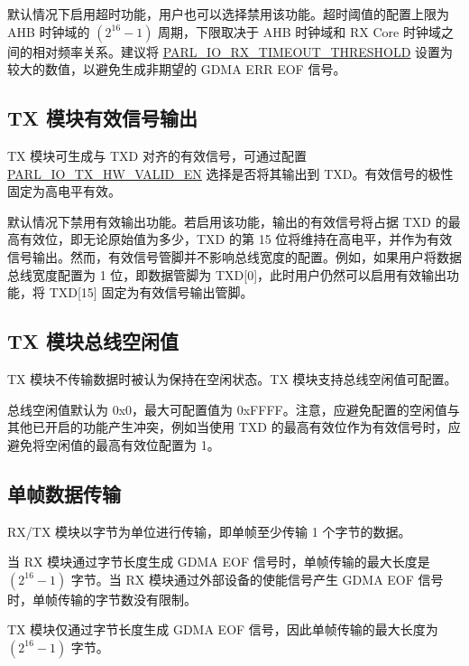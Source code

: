 \documentclass[main\_\_CN.tex]{subfiles}
\begin{document}
默认情况下启用超时功能，用户也可以选择禁用该功能。超时阈值的配置上限为 AHB 时钟域的 \begin{math} (2^{16}-1) \end{math} 周期，下限取决于 AHB 时钟域和 RX Core 时钟域之间的相对频率关系。建议将 \hyperref[fielddesc:PARLIORXTIMEOUTTHRESHOLD] {PARL\_IO\_RX\_TIMEOUT\_THRESHOLD} 设置为较大的数值，以避免生成非期望的 GDMA ERR EOF 信号。


\subsection{TX 模块有效信号输出}

TX 模块可生成与 TXD 对齐的有效信号，可通过配置 \hyperref[fielddesc:PARLIOTXHWVALIDEN]{PARL\_IO\_TX\_HW\_VALID\_EN} 选择是否将其输出到 TXD。有效信号的极性固定为高电平有效。

默认情况下禁用有效输出功能。若启用该功能，输出的有效信号将占据 TXD 的最高有效位，即无论原始值为多少，TXD 的第 15 位将维持在高电平，并作为有效信号输出。然而，有效信号管脚并不影响总线宽度的配置。例如，如果用户将数据总线宽度配置为 1 位，即数据管脚为 TXD[0]，此时用户仍然可以启用有效输出功能，将 TXD[15] 固定为有效信号输出管脚。

\subsection{TX 模块总线空闲值}
TX 模块不传输数据时被认为保持在空闲状态。TX 模块支持总线空闲值可配置。

总线空闲值默认为 0x0，最大可配置值为 0xFFFF。注意，应避免配置的空闲值与其他已开启的功能产生冲突，例如当使用 TXD 的最高有效位作为有效信号时，应避免将空闲值的最高有效位配置为 1。

\subsection{单帧数据传输}

RX/TX 模块以字节为单位进行传输，即单帧至少传输 1 个字节的数据。

当 RX 模块通过字节长度生成 GDMA EOF 信号时，单帧传输的最大长度是 \begin{math} (2^{16}-1) \end{math} 字节。当 RX 模块通过外部设备的使能信号产生 GDMA EOF 信号时，单帧传输的字节数没有限制。

TX 模块仅通过字节长度生成 GDMA EOF 信号，因此单帧传输的最大长度为 \begin{math} (2^{16}-1) \end{math} 字节。
\end{document}
